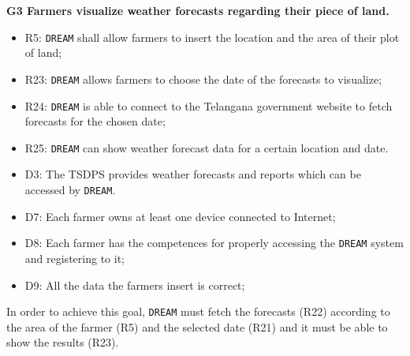 \documentclass{article}
\begin{document}
\textbf{G3 Farmers visualize weather forecasts regarding their piece of land.}
\begin{itemize}
    \item R5: \verb|DREAM| shall allow farmers to insert the location and the area of their plot of land;

    \item R23: \verb|DREAM| allows farmers to choose the date of the forecasts to visualize;
  
    \item R24: \verb|DREAM| is able to connect to the Telangana government website to fetch forecasts for the chosen date;
  
    \item R25: \verb|DREAM| can show weather forecast data for a certain location and date.
    
    \item D3: The TSDPS provides weather forecasts and reports which can be accessed by \verb|DREAM|.
    
    \item D7: Each farmer owns at least one device connected to Internet;
    
    \item D8: Each farmer has the competences for properly accessing the \verb|DREAM| system and registering to it;
    
    \item D9: All the data the farmers insert is correct;
\end{itemize}
In order to achieve this goal, \verb|DREAM| must fetch the forecasts (R22) according to the area of the farmer (R5) and the selected date (R21) and it must be able to show the results (R23).
\end{document}
